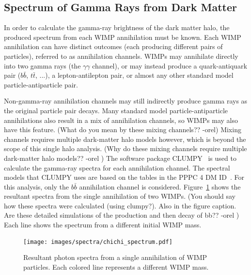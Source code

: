   
  \FloatBarrier
  
    
  \subsection{Spectrum of Gamma Rays from Dark Matter}\label{dm_spectral}
    In order to calculate the gamma-ray brightness of the dark matter halo, the produced spectrum from each WIMP annihilation must be known.
    Each WIMP annihilation can have distinct outcomes (each producing different pairs of particles), referred to as annihilation channels.
    WIMPs may annihilate directly into two gamma rays (the $\gamma\gamma$ channel), or may instead produce a quark-antiquark pair ($b\bar{b}$, $t\bar{t}$, ...), a lepton-antilepton pair, or almost any other standard model particle-antiparticle pair.

    Non-gamma-ray annihilation channels may still indirectly produce gamma rays as the original particle pair decays.
    Many standard model particle-antiparticle annihilations also result in a mix of annihilation channels, so WIMPs may also have this feature.
    {\color{red}(What do you mean by these mixing channels?? -orel)}
    Mixing channels requires multiple dark-matter halo models however, which is beyond the scope of this single halo analysis.
    {\color{red}(Why do these mixing channels require multiple dark-matter halo models?? -orel )}
    The software package CLUMPY~\cite{CLUMPYcode} is used to calculate the gamma-ray spectra for each annihilation channel.
    The spectral models that CLUMPY uses are based on the tables in the PPPC 4 DM ID~\cite{pppc4_dm_spectra}.
    For this analysis, only the $b\bar{b}$ annihilation channel is considered.
    Figure~\ref{fig:chichi_spectrum} shows the resultant spectra from the single annihilation of two WIMPs.
    {\color{red}(You should say how these spectra were calculated (using clumpy?). Also in the figure caption. Are these detailed simulations of the production and then decay of bb?? -orel )}
    Each line shows the spectrum from a different initial WIMP mass.

    \begin{figure}[ht]
      \centering
      \texttt{[image: images/spectra/chichi\_spectrum.pdf]}
      \caption[Single Annihilation Spectra]{
        Resultant photon spectra from a single annihilation of WIMP particles.
        Each colored line represents a different WIMP mass.}
      \label{fig:chichi_spectrum}
    \end{figure}


